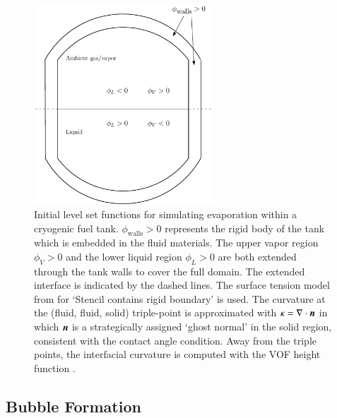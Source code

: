 \documentclass[preprint,12pt]{Definitions/elsarticle}
\newcommand{\bmn}{\mbox{\boldmath $n$\unboldmath}}
\begin{document}
\begin{figure}[H]
	\includegraphics[width=0.6\textwidth]{cryogenictankLS.eps}
	\caption{ Initial level set functions for simulating evaporation within a cryogenic fuel tank. $\phi_{\mbox{walls}}>0$ represents the rigid body of the tank which is embedded in the fluid materials. The upper vapor region $\phi_{V}>0$ and the lower liquid region $\phi_{L}>0$ are both extended through the tank walls to cover the full domain. The extended interface is indicated by the dashed lines. The surface tension model from \cite{LiETAL2015IncompressibleMultiphase} for `Stencil contains rigid boundary' is used. The curvature at the (fluid, fluid, solid) triple-point is approximated with $\kappa=\nabla\cdot\bmn$ in which $\bmn$ is a strategically assigned 
		`ghost normal' in the solid region, consistent with the contact angle condition. Away from the triple points, the interfacial curvature is computed with the VOF height function \cite{sussman2003second}.
	}
	\label{tank_levelset}
\end{figure}   
\unskip






\FloatBarrier
\subsection{Bubble Formation}
\end{document}
